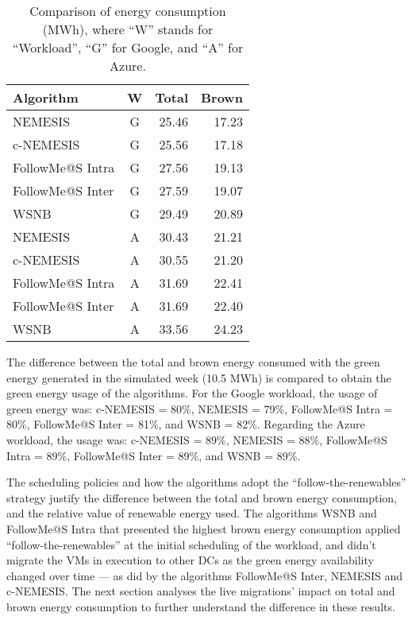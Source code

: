 \begin{table}[!h]
\caption{Comparison of energy consumption (MWh), where ``W'' stands for ``Workload'', ``G'' for Google, and ``A'' for Azure.}\label{tab:total_energy_cons} \centering
\begin{tabular}{|l|c|r|r|}
  \hline
  \textbf{Algorithm} & \textbf{W} & \textbf{Total} &  \textbf{Brown} \\
  \hline  
  NEMESIS  & G & 25.46 & 17.23 \\
  \hline
  c-NEMESIS & G & 25.56 & 17.18 \\
  \hline
  FollowMe@S Intra  & G & 27.56 & 19.13 \\
  \hline
  FollowMe@S Inter  & G & 27.59 & 19.07 \\
  \hline
  WSNB  & G & 29.49 & 20.89 \\
  \hline
  NEMESIS  & A  & 30.43 & 21.21 \\
  \hline
  c-NEMESIS & A  & 30.55 & 21.20 \\
  \hline
  FollowMe@S Intra  & A  & 31.69 & 22.41 \\
  \hline
  FollowMe@S Inter  & A  & 31.69 & 22.40 \\
  \hline
  WSNB & A   & 33.56 & 24.23 \\
  \hline
\end{tabular}
\end{table}

The difference between the total and brown energy consumed with the green energy generated in the simulated week (10.5 MWh) is compared to obtain the green energy usage of the algorithms. For the Google workload, the usage of green energy was: c-NEMESIS = 80\%, NEMESIS = 79\%, FollowMe@S Intra = 80\%, FollowMe@S Inter = 81\%, and WSNB = 82\%. Regarding the Azure workload, the usage was: c-NEMESIS = 89\%, NEMESIS = 88\%, FollowMe@S Intra = 89\%, FollowMe@S Inter = 89\%, and WSNB = 89\%. 


The scheduling policies and how the algorithms adopt the ``follow-the-renewables'' strategy justify the difference between the total and brown energy consumption, and the relative value of renewable energy used. The algorithms WSNB and FollowMe@S Intra that presented the highest brown energy consumption applied ``follow-the-renewables'' at the initial scheduling of the workload, and didn't migrate the VMs in execution to other DCs as the green energy availability changed over time --- as did by the algorithms FollowMe@S Inter, NEMESIS and c-NEMESIS. The next section analyses the live migrations' impact on total and brown energy consumption to further understand the difference in these results.

